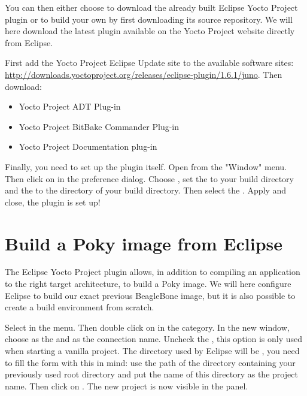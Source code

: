 You can then either choose to download the already built Eclipse Yocto Project
plugin or to build your own by first downloading its source repository. We will
here download the latest plugin available on the Yocto Project website directly
from Eclipse.

First add the Yocto Project Eclipse Update site to the available software sites:
\url{http://downloads.yoctoproject.org/releases/eclipse-plugin/1.6.1/juno}.
Then download:
\begin{itemize}
  \item Yocto Project ADT Plug-in
  \item Yocto Project BitBake Commander Plug-in
  \item Yocto Project Documentation plug-in
\end{itemize}

Finally, you need to set up the plugin itself. Open  from the
"Window" menu. Then click on  in the preference dialog.
Choose , set the  to your build directory and the  to the
 directory of your build directory. Then select the
. Apply and close, the plugin is set up!

\section{Build a Poky image from Eclipse}

The Eclipse Yocto Project plugin allows, in addition to compiling an application
to the right target architecture, to build a Poky image. We will here configure
Eclipse to build our exact previous BeagleBone image, but it is also possible to
create a build environment from scratch.

Select  in the  menu. Then double click on  in the  category. In the new
window, choose  as the  and
 as the connection name. Uncheck the , this option is only used when starting a
vanilla project. The directory used by Eclipse will be , you need to fill the form with this in mind: use the path of the
directory containing your previously used  root directory and put
the name of this directory as the project name. Then click on .
The new project is now visible in the  panel.

